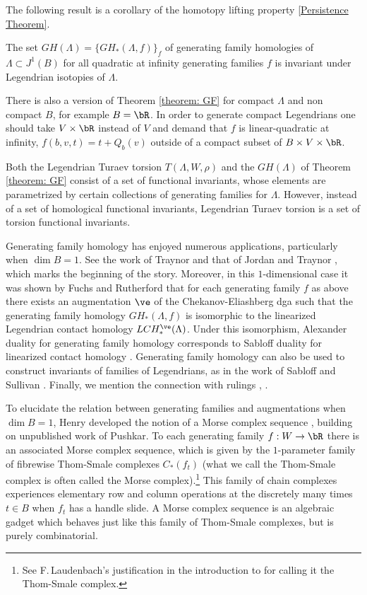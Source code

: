 The following result is a corollary of the homotopy lifting property \ref{Persistence Theorem}.

\begin{theorem}\label{theorem: GF}
The set $GH(\Lambda)=\{ GH_*(\Lambda, f) \}_f $ of generating family homologies of $\Lambda \subset J^1(B)$ for all quadratic at infinity generating families $f$ is invariant under Legendrian isotopies of $\Lambda$.
\end{theorem}

\begin{remark}
There is also a version of Theorem \ref{theorem: GF} for compact $\Lambda$ and non compact $B$, for example $B=\bR$. In order to generate compact Legendrians one should take $V \times \bR$ instead of $V$ and demand that $f$ is linear-quadratic at infinity, \ie $f(b,v,t)=t+Q_b(v)$ outside of a compact subset of $B \times V \times \bR$.
\end{remark}

\begin{remark}
Both the Legendrian Turaev torsion $T(\Lambda, W, \rho)$ and the $GH(\Lambda)$ of Theorem \ref{theorem: GF} consist of a set of functional invariants, whose elements are parametrized by certain collections of generating families for $\Lambda$. However, instead of a set of homological functional invariants, Legendrian Turaev torsion is a set of torsion functional invariants.
\end{remark}

Generating family homology has enjoyed numerous applications, particularly when $\dim B =1$. See the work of Traynor \cite{T01} and that of Jordan and Traynor \cite{T06}, which marks the beginning of the story. Moreover, in this $1$-dimensional case it was shown by Fuchs and Rutherford \cite{FR11} that for each generating family $f$ as above there exists an augmentation $\ve$ of the Chekanov-Eliashberg dga such that the generating family homology $GH_*(\Lambda, f)$ is isomorphic to the linearized Legendrian contact homology $LCH^\ve_*(\Lambda)$. Under this isomorphism, Alexander duality for generating family homology corresponds to Sabloff duality for linearized contact homology \cite{S06}. Generating family homology can also be used to construct invariants of families of Legendrians, as in the work of Sabloff and Sullivan \cite{SS16}. Finally, we mention the connection with rulings \cite{FI04}, \cite{S05}.

To elucidate the relation between generating families and augmentations when $\dim B =1$, Henry developed the notion of a Morse complex sequence \cite{H04}, building on unpublished work of Pushkar. To each generating family $f:W \to \bR$ there is an associated Morse complex sequence, which is given by the $1$-parameter family of fibrewise Thom-Smale complexes $C_*(f_t)$ (what we call the Thom-Smale complex is often called the Morse complex).\footnote{See F.\,Laudenbach's justification in the introduction to \cite{La11} for calling it the Thom-Smale complex.} This family of chain complexes experiences elementary row and column operations at the discretely many times $t \in B$ when $f_t$ has a handle slide. A Morse complex sequence is an algebraic gadget which behaves just like this family of Thom-Smale complexes, but is purely combinatorial.

